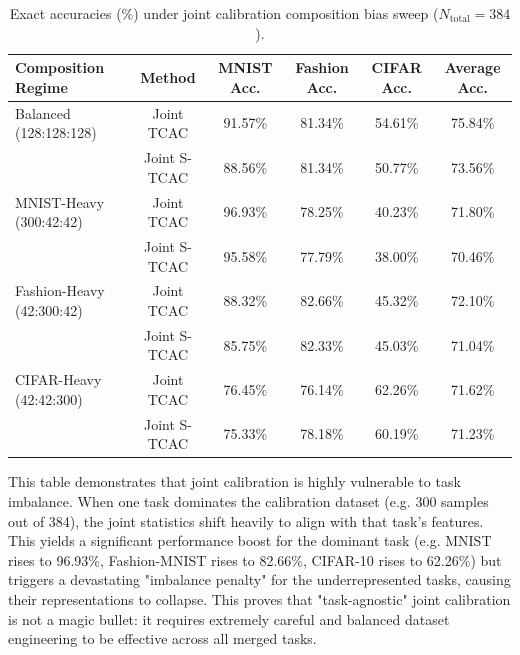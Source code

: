 \documentclass{article}
\theoremstyle{plain}
\theoremstyle{definition}
\theoremstyle{remark}
\begin{document}
\begin{table}[ht]
\caption{Exact accuracies (\%) under joint calibration composition bias sweep ($N_{\text{total}} = 384$).}
\label{tab:numerical_composition}
\vskip 0.15in
\begin{center}
\begin{small}
\begin{sc}
\begin{tabular}{lccccc}
\toprule
Composition Regime & Method & MNIST Acc. & Fashion Acc. & CIFAR Acc. & Average Acc. \\
\midrule
Balanced (128:128:128) & Joint TCAC & 91.57\% & 81.34\% & 54.61\% & 75.84\% \\
                       & Joint S-TCAC & 88.56\% & 81.34\% & 50.77\% & 73.56\% \\
\midrule
MNIST-Heavy (300:42:42) & Joint TCAC & 96.93\% & 78.25\% & 40.23\% & 71.80\% \\
                        & Joint S-TCAC & 95.58\% & 77.79\% & 38.00\% & 70.46\% \\
\midrule
Fashion-Heavy (42:300:42) & Joint TCAC & 88.32\% & 82.66\% & 45.32\% & 72.10\% \\
                          & Joint S-TCAC & 85.75\% & 82.33\% & 45.03\% & 71.04\% \\
\midrule
CIFAR-Heavy (42:42:300) & Joint TCAC & 76.45\% & 76.14\% & 62.26\% & 71.62\% \\
                        & Joint S-TCAC & 75.33\% & 78.18\% & 60.19\% & 71.23\% \\
\bottomrule
\end{tabular}
\end{sc}
\end{small}
\end{center}
\vskip -0.1in
\end{table}

This table demonstrates that joint calibration is highly vulnerable to task imbalance. When one task dominates the calibration dataset (e.g. 300 samples out of 384), the joint statistics shift heavily to align with that task's features. This yields a significant performance boost for the dominant task (e.g. MNIST rises to 96.93\%, Fashion-MNIST rises to 82.66\%, CIFAR-10 rises to 62.26\%) but triggers a devastating "imbalance penalty" for the underrepresented tasks, causing their representations to collapse. This proves that "task-agnostic" joint calibration is not a magic bullet: it requires extremely careful and balanced dataset engineering to be effective across all merged tasks.
\end{document}
